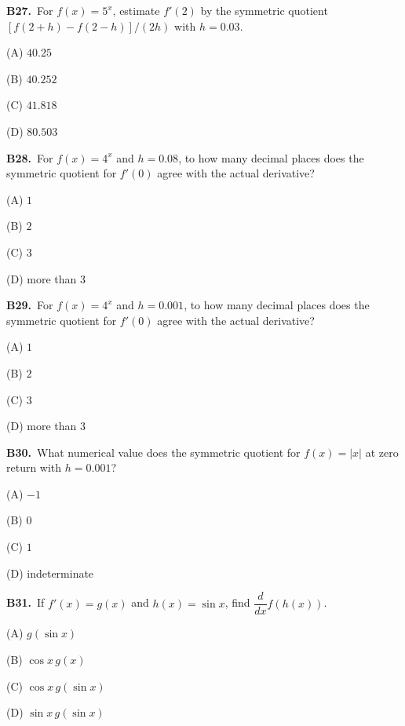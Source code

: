 \documentclass[11pt]{article}
\begin{document}
\bigskip\noindent\textbf{B27.}\ For $f(x)=5^x$, estimate $f'(2)$ by the symmetric quotient $[f(2+h)-f(2-h)]/(2h)$ with $h=0.03$.
\begin{list}{}{\setlength{\leftmargin}{3em}\setlength{\labelwidth}{2.5em}\setlength{\itemsep}{0pt}\setlength{\topsep}{2pt}}
\item[(A)] $40.25$
\item[(B)] $40.252$
\item[(C)] $41.818$
\item[(D)] $80.503$
\end{list}

\bigskip\noindent\textbf{B28.}\ For $f(x)=4^x$ and $h=0.08$, to how many decimal places does the symmetric quotient for $f'(0)$ agree with the actual derivative?
\begin{list}{}{\setlength{\leftmargin}{3em}\setlength{\labelwidth}{2.5em}\setlength{\itemsep}{0pt}\setlength{\topsep}{2pt}}
\item[(A)] $1$
\item[(B)] $2$
\item[(C)] $3$
\item[(D)] more than $3$
\end{list}

\bigskip\noindent\textbf{B29.}\ For $f(x)=4^x$ and $h=0.001$, to how many decimal places does the symmetric quotient for $f'(0)$ agree with the actual derivative?
\begin{list}{}{\setlength{\leftmargin}{3em}\setlength{\labelwidth}{2.5em}\setlength{\itemsep}{0pt}\setlength{\topsep}{2pt}}
\item[(A)] $1$
\item[(B)] $2$
\item[(C)] $3$
\item[(D)] more than $3$
\end{list}

\bigskip\noindent\textbf{B30.}\ What numerical value does the symmetric quotient for $f(x)=|x|$ at zero return with $h=0.001$?
\begin{list}{}{\setlength{\leftmargin}{3em}\setlength{\labelwidth}{2.5em}\setlength{\itemsep}{0pt}\setlength{\topsep}{2pt}}
\item[(A)] $-1$
\item[(B)] $0$
\item[(C)] $1$
\item[(D)] indeterminate
\end{list}

\bigskip\noindent\textbf{B31.}\ If $f'(x)=g(x)$ and $h(x)=\sin x$, find $\dfrac{d}{dx}f(h(x))$.
\begin{list}{}{\setlength{\leftmargin}{3em}\setlength{\labelwidth}{2.5em}\setlength{\itemsep}{0pt}\setlength{\topsep}{2pt}}
\item[(A)] $g(\sin x)$
\item[(B)] $\cos x\,g(x)$
\item[(C)] $\cos x\,g(\sin x)$
\item[(D)] $\sin x\,g(\sin x)$
\end{list}
\end{document}
